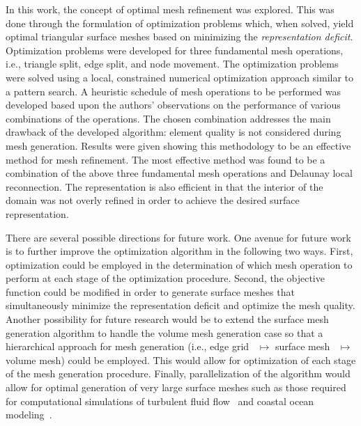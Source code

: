 In this work, the concept of optimal mesh refinement was explored. This
was done through the formulation of optimization problems which, when
solved, yield optimal triangular surface meshes based on minimizing the
{\it representation deficit}.  Optimization problems were developed for
three fundamental mesh operations, i.e., triangle split, edge split, and
node movement.  The optimization problems were solved using a local,
constrained numerical optimization approach similar to a pattern search.
A heuristic schedule of mesh operations to be performed was developed
based upon the authors' observations on the performance of various
combinations of the operations. The chosen combination addresses the
main drawback of the developed algorithm: element quality is not
considered during mesh generation. Results were given showing this
methodology to be an effective method for mesh refinement. The most
effective method was found to be a combination of the above three
fundamental mesh operations and Delaunay local reconnection. The
representation is also efficient in that the interior of the domain was
not overly refined in order to achieve the desired surface
representation.

There are several possible directions for future work.  One avenue for
future work is to further improve the optimization algorithm in the
following two ways.  First, optimization could be employed in the
determination of which mesh operation to perform at each stage of the
optimization procedure.  Second, the objective function could be
modified in order to generate surface meshes that simultaneously
minimize the representation deficit and optimize the mesh quality.
Another possibility for future research would be to extend the surface
mesh generation algorithm to handle the volume mesh generation case so
that a hierarchical approach for mesh generation (i.e., edge
grid~\cite{mclaurin13} $\mapsto$ surface mesh~\cite{mclaurin14}
$\mapsto$ volume mesh) could be employed. This would allow for
optimization of each stage of the mesh generation procedure.  Finally,
parallelization of the algorithm would allow for optimal generation of
very large surface meshes such as those required for computational
simulations of turbulent fluid flow~\cite{turbulence} and coastal
ocean modeling~\cite{coastal_ocean_modeling}.
